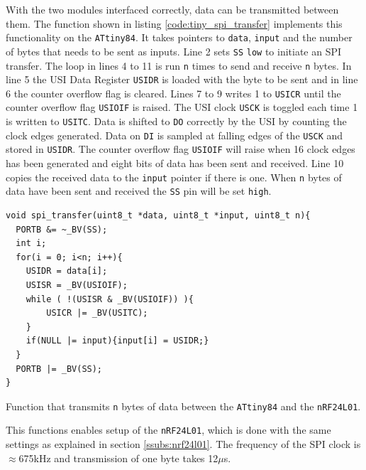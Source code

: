 {With the two modules interfaced correctly, data can be transmitted between them.
The function shown in listing \ref{code:tiny_spi_transfer} implements this functionality on the \texttt{ATtiny84}.
It takes pointers to \texttt{data}, \texttt{input} and the number of bytes that needs to be sent as inputs.
Line 2 sets \texttt{SS} \texttt{low} to initiate an SPI transfer.
The loop in lines 4 to 11 is run \texttt{n} times to send and receive \texttt{n} bytes.
In line 5 the USI Data Register \texttt{USIDR} is loaded with the byte to be sent and in line 6 the counter overflow flag is cleared.
Lines 7 to 9 writes 1 to \texttt{USICR} until the counter overflow flag \texttt{USIOIF} is raised.
The USI clock \texttt{USCK} is toggled each time 1 is written to \texttt{USITC}.
Data is shifted to \texttt{DO} correctly by the USI by counting the clock edges generated. 
Data on \texttt{DI} is sampled at falling edges of the \texttt{USCK} and stored in \texttt{USIDR}.
The counter overflow flag \texttt{USIOIF} will raise when 16 clock edges has been generated and eight bits of data has been sent and received.
Line 10 copies the received data to the \texttt{input} pointer if there is one.
When \texttt{n} bytes of data have been sent and received the \texttt{SS} pin will be set \texttt{high}.
\begin{listing}[h] 
\begin{verbatim}
void spi_transfer(uint8_t *data, uint8_t *input, uint8_t n){
  PORTB &= ~_BV(SS);
  int i;
  for(i = 0; i<n; i++){
	USIDR = data[i];
	USISR = _BV(USIOIF);  
	while ( !(USISR & _BV(USIOIF)) ){
		USICR |= _BV(USITC);  
	} 
	if(NULL |= input){input[i] = USIDR;}
  }
  PORTB |= _BV(SS);
}
\end{verbatim}
\caption{Function that transmits \texttt{n} bytes of data between the \texttt{ATtiny84} and the \texttt{nRF24L01}.}
\label{code:tiny_spi_transfer}
\end{listing}

This functions enables setup of the \texttt{nRF24L01}, which is done with the same settings as explained in section \ref{ssubs:nrf24l01}.
The frequency of the SPI clock is $\approx$675kHz and transmission of one byte takes 12$\mu$s.


}
